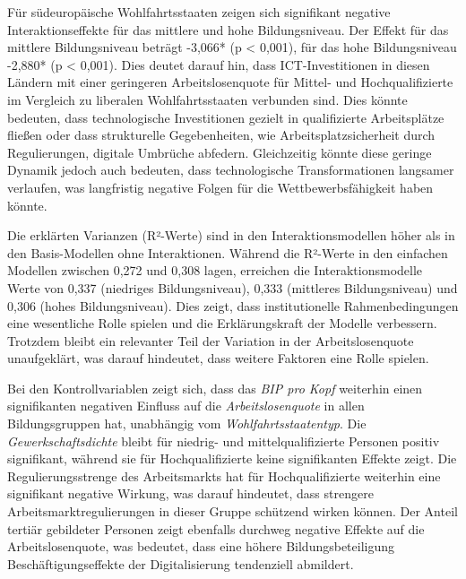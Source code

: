 Für südeuropäische Wohlfahrtsstaaten zeigen sich signifikant negative Interaktionseffekte für das mittlere 
und hohe Bildungsniveau. Der Effekt für das mittlere Bildungsniveau beträgt -3,066* (p < 0,001), für das 
hohe Bildungsniveau -2,880* (p < 0,001). Dies deutet darauf hin, dass \ac{ICT}-Investitionen in diesen Ländern 
mit einer geringeren Arbeitslosenquote für Mittel- und Hochqualifizierte im Vergleich zu liberalen 
Wohlfahrtsstaaten verbunden sind. Dies könnte bedeuten, dass technologische Investitionen gezielt in 
qualifizierte Arbeitsplätze fließen oder dass strukturelle Gegebenheiten, wie Arbeitsplatzsicherheit 
durch Regulierungen, digitale Umbrüche abfedern. Gleichzeitig könnte diese geringe Dynamik jedoch auch 
bedeuten, dass technologische Transformationen langsamer verlaufen, was langfristig negative Folgen für 
die Wettbewerbsfähigkeit haben könnte.

Die erklärten Varianzen (R²-Werte) sind in den Interaktionsmodellen höher als in den Basis-Modellen ohne 
Interaktionen. Während die R²-Werte in den einfachen Modellen zwischen 0,272 und 0,308 lagen, erreichen 
die Interaktionsmodelle Werte von 0,337 (niedriges Bildungsniveau), 0,333 (mittleres Bildungsniveau) und 
0,306 (hohes Bildungsniveau). Dies zeigt, dass institutionelle Rahmenbedingungen eine wesentliche Rolle 
spielen und die Erklärungskraft der Modelle verbessern. Trotzdem bleibt ein relevanter Teil der Variation 
in der Arbeitslosenquote unaufgeklärt, was darauf hindeutet, dass weitere Faktoren eine Rolle spielen.

Bei den Kontrollvariablen zeigt sich, dass das \textit{\ac{BIP} pro Kopf} weiterhin einen signifikanten negativen 
Einfluss auf die \textit{Arbeitslosenquote} in allen Bildungsgruppen hat, unabhängig vom \textit{Wohlfahrtsstaatentyp}. 
Die \textit{Gewerkschaftsdichte} bleibt für niedrig- und mittelqualifizierte Personen positiv signifikant, 
während sie für Hochqualifizierte keine signifikanten Effekte zeigt. Die Regulierungsstrenge des 
Arbeitsmarkts hat für Hochqualifizierte weiterhin eine signifikant negative Wirkung, was darauf 
hindeutet, dass strengere Arbeitsmarktregulierungen in dieser Gruppe schützend wirken können. Der Anteil 
tertiär gebildeter Personen zeigt ebenfalls durchweg negative Effekte auf die Arbeitslosenquote, was 
bedeutet, dass eine höhere Bildungsbeteiligung Beschäftigungseffekte der Digitalisierung tendenziell 
abmildert.

